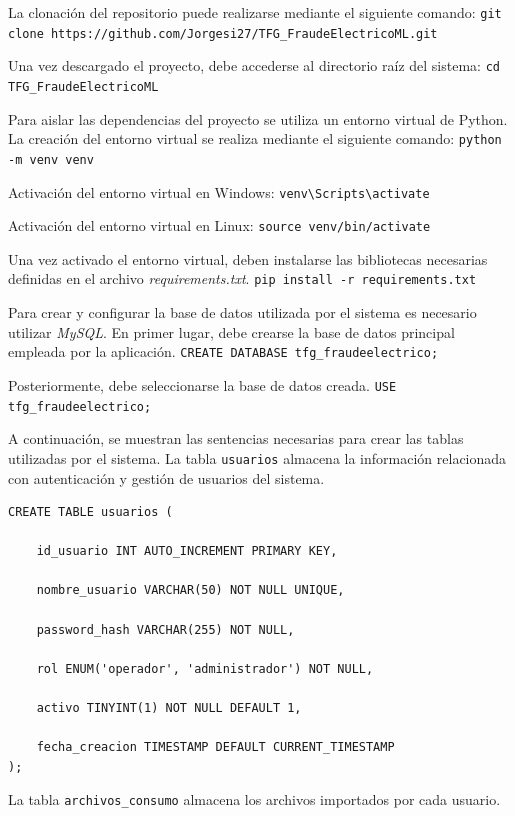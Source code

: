 \documentclass[12pt,a4paper]{report}
\begin{document}
La clonación del repositorio puede realizarse mediante el siguiente comando: \texttt{git clone https://github.com/Jorgesi27/TFG\_FraudeElectricoML.git}

Una vez descargado el proyecto, debe accederse al directorio raíz del sistema: \texttt{cd TFG\_FraudeElectricoML}

Para aislar las dependencias del proyecto se utiliza un entorno virtual de Python. La creación del entorno virtual se realiza mediante el siguiente comando: \texttt{python -m venv venv}

\noindent Activación del entorno virtual en Windows: \texttt{venv\textbackslash Scripts\textbackslash activate}

\noindent Activación del entorno virtual en Linux: \texttt{source venv/bin/activate}

Una vez activado el entorno virtual, deben instalarse las bibliotecas necesarias definidas en el archivo \emph{requirements.txt}. \texttt{pip install -r requirements.txt}

Para crear y configurar la base de datos utilizada por el sistema es necesario utilizar \emph{MySQL}. En primer lugar, debe crearse la base de datos principal empleada por la aplicación. \texttt{CREATE DATABASE tfg\_fraudeelectrico;}

\noindent Posteriormente, debe seleccionarse la base de datos creada. \texttt{USE tfg\_fraudeelectrico;}

A continuación, se muestran las sentencias necesarias para crear las tablas utilizadas por el sistema. La tabla \texttt{usuarios} almacena la información relacionada con autenticación y gestión de usuarios del sistema.

\begin{lstlisting}[caption={Tabla de usuarios.}, label={lst:tabla_usuarios}]
CREATE TABLE usuarios (

    id_usuario INT AUTO_INCREMENT PRIMARY KEY,

    nombre_usuario VARCHAR(50) NOT NULL UNIQUE,

    password_hash VARCHAR(255) NOT NULL,

    rol ENUM('operador', 'administrador') NOT NULL,

    activo TINYINT(1) NOT NULL DEFAULT 1,

    fecha_creacion TIMESTAMP DEFAULT CURRENT_TIMESTAMP
);
\end{lstlisting}

\medskip
\noindent La tabla \texttt{archivos\_consumo} almacena los archivos importados por cada usuario.
\end{document}
